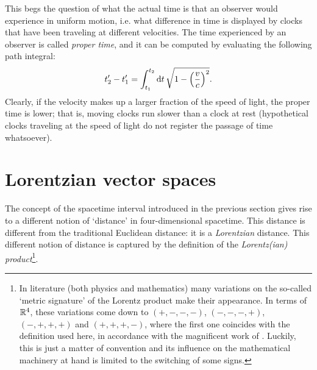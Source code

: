 This begs the question of what the actual time is that an observer would experience in uniform motion, i.e. what difference in time is displayed by clocks that have been traveling at different velocities. The time experienced by an observer is called \emph{proper time}, and it can be computed by evaluating the following path integral:
\begin{equation}
    t'_2 - t'_1 = \int^{t_2}_{t_1} \dd{t} \sqrt{1 - \qty(\frac{v}{c})^2}.
    \label{eq:proper_time}
\end{equation}
Clearly, if the velocity  makes up a larger fraction of the speed of light, the proper time is lower; that is, moving clocks run slower than a clock at rest (hypothetical clocks traveling at the speed of light do not register the passage of time whatsoever).

\section{Lorentzian vector spaces}
\label{sec:lorentz_metric}
The concept of the spacetime interval introduced in the previous section gives rise to a different notion of `distance' in four-dimensional spacetime. This distance is different from the traditional Euclidean distance: it is a \emph{Lorentzian} distance. This different notion of distance is captured by the definition of the \emph{Lorentz(ian) product}\footnote{In literature (both physics and mathematics) many variations on the so-called `metric signature' of the Lorentz product make their appearance. In terms of \(\mathbb{R}^4\), these variations come down to \((+,-,-,-)\), \((-,-,-,+)\), \((-,+,+,+)\) and \((+,+,+,-)\), where the first one coincides with the definition used here, in accordance with the magnificent work of \citet{Landau1971}. Luckily, this is just a matter of convention and its influence on the mathematical machinery at hand is limited to the switching of some signs.}.

